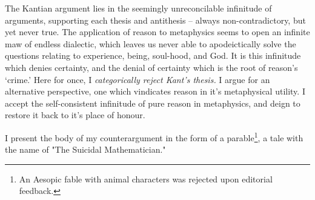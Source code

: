 \noindent
The Kantian argument lies in the seemingly unreconcilable infinitude of arguments, supporting each thesis and antithesis -- always non-contradictory, but yet never true. The application of reason to metaphysics seems to open an infinite maw of endless dialectic, which leaves us never able to apodeictically solve the questions relating to experience, being, soul-hood, and God. It is this infinitude which denies certainty, and the denial of certainty which is the root of reason's `crime.' Here for once, I \emph{categorically reject Kant's thesis.} I argue for an alternative perspective, one which vindicates reason in it's metaphysical utility. I accept the self-consistent infinitude of pure reason in metaphysics, and deign to restore it back to it's place of honour.

I present the body of my counterargument in the form of a parable\footnote{An Aesopic fable with animal characters was rejected upon editorial feedback.}, a tale with the name of "The Suicidal Mathematician."


